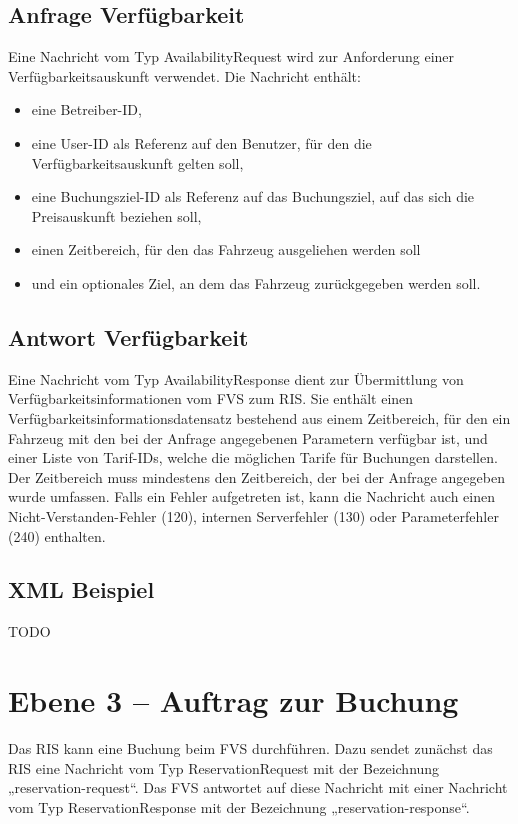 

\subsection{Anfrage Verfügbarkeit}
Eine Nachricht vom Typ AvailabilityRequest wird zur Anforderung einer Verfügbarkeitsauskunft verwendet. Die Nachricht enthält:
\begin{itemize}
\item eine Betreiber-ID,
\item eine User-ID als Referenz auf den Benutzer, für den die Verfügbarkeitsauskunft gelten soll,
\item eine Buchungsziel-ID als Referenz auf das Buchungsziel, auf das sich die Preisauskunft beziehen soll,
\item einen Zeitbereich, für den das Fahrzeug ausgeliehen werden soll
\item und ein optionales Ziel, an dem das Fahrzeug zurückgegeben werden soll.
\end{itemize}



\subsection{Antwort Verfügbarkeit}
Eine Nachricht vom Typ AvailabilityResponse dient zur Übermittlung von Verfügbarkeitsinformationen vom FVS zum RIS. Sie enthält einen Verfügbarkeitsinformationsdatensatz bestehend aus einem Zeitbereich, für den ein Fahrzeug mit den bei der Anfrage angegebenen Parametern verfügbar ist, und einer Liste von Tarif-IDs, welche die möglichen Tarife für Buchungen darstellen. Der Zeitbereich muss mindestens den Zeitbereich, der bei der Anfrage angegeben wurde umfassen. Falls ein Fehler aufgetreten ist, kann die Nachricht auch einen Nicht-Verstanden-Fehler (120), internen Serverfehler (130) oder Parameterfehler (240) enthalten.



\subsection{XML Beispiel}
TODO

\section{Ebene 3 -- Auftrag zur Buchung}
Das RIS kann eine Buchung beim FVS durchführen. Dazu sendet zunächst das RIS eine Nachricht vom Typ ReservationRequest mit der Bezeichnung „reservation-request“. Das FVS antwortet auf diese Nachricht mit einer Nachricht vom Typ ReservationResponse mit der Bezeichnung „reservation-response“.

